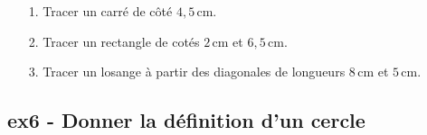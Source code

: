 \begin{enumerate}
  \item[1.] Tracer un carré de côté $4,5$\,cm.
  \item[2.] Tracer un rectangle de cotés $2$\,cm et $6,5$\,cm. 
  \item[3.] Tracer un losange à partir des diagonales de longueurs $8$\,cm et $5$\,cm. 
\end{enumerate} 

\subsection*{ex6 - Donner la définition d'un cercle}

\Pointilles[4]


